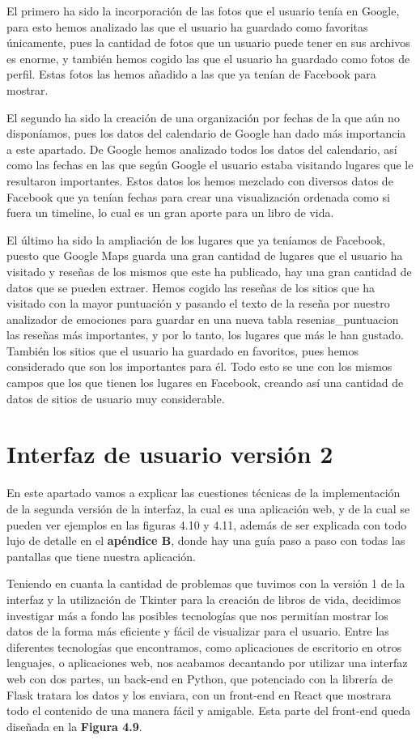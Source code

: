 El primero ha sido la incorporación de las fotos que el usuario tenía en Google, para esto hemos analizado las que el usuario ha guardado como favoritas únicamente, pues la cantidad de fotos que un usuario puede tener en sus archivos es enorme, y también hemos cogido las que el usuario ha guardado como fotos de perfil. Estas fotos las hemos añadido a las que ya tenían de Facebook para mostrar.

El segundo ha sido la creación de una organización por fechas de la que aún no disponíamos, pues los datos del calendario de Google han dado más importancia a este apartado. De Google hemos analizado todos los datos del calendario, así como las fechas en las que según Google el usuario estaba visitando lugares que le resultaron importantes. Estos datos los hemos mezclado con diversos datos de Facebook que ya tenían fechas para crear una visualización ordenada como si fuera un timeline, lo cual es un gran aporte para un libro de vida.

El último ha sido la ampliación de los lugares que ya teníamos de Facebook, puesto que Google Maps guarda una gran cantidad de lugares que el usuario ha visitado y reseñas de los mismos que este ha publicado, hay una gran cantidad de datos que se pueden extraer. Hemos cogido las reseñas de los sitios que ha visitado con la mayor puntuación y pasando el texto de la reseña por nuestro analizador de emociones para guardar en una nueva tabla resenias\_puntuacion las reseñas más importantes, y por lo tanto, los lugares que más le han gustado. También los sitios que el usuario ha guardado en favoritos, pues hemos considerado que son los importantes para él. Todo esto se une con los mismos campos que los que tienen los lugares en Facebook, creando así una cantidad de datos de sitios de usuario muy considerable.

\newpage
\section{Interfaz de usuario versión 2}
En este apartado vamos a explicar las cuestiones técnicas de la implementación de la segunda versión de la interfaz, la cual es una aplicación web, y de la cual se pueden ver ejemplos en las figuras 4.10 y 4.11, además de ser explicada con todo lujo de detalle en el \textbf{apéndice B}, donde hay una guía paso a paso con todas las pantallas que tiene nuestra aplicación.


Teniendo en cuanta la cantidad de problemas que tuvimos con la versión 1 de la interfaz y la utilización de Tkinter para la creación de libros de vida, decidimos investigar más a fondo las posibles tecnologías que nos permitían mostrar los datos de la forma más eficiente y fácil de visualizar para el usuario. Entre las diferentes tecnologías que encontramos, como aplicaciones de escritorio en otros lenguajes, o aplicaciones web, nos acabamos decantando por utilizar una interfaz web con dos partes, un back-end en Python, que potenciado con la librería de Flask tratara los datos y los enviara, con un front-end en React que mostrara todo el contenido de una manera fácil y amigable. Esta parte del front-end queda diseñada en la \textbf{Figura 4.9}.


